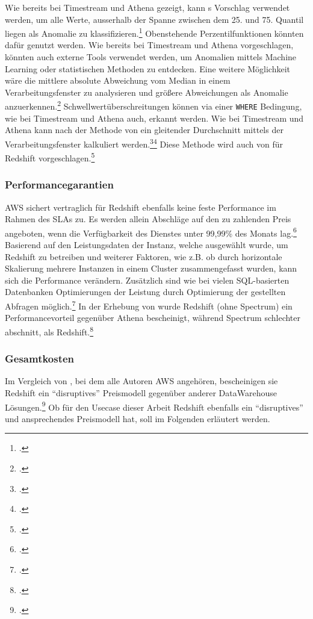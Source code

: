 Wie bereits bei Timestream und Athena gezeigt, kann \citeauthor{Salgado.2019}s Vorschlag verwendet werden, um alle Werte, ausserhalb der Spanne zwischen dem 25. und 75. Quantil liegen als Anomalie zu klassifizieren.\footcite[Vgl.][]{Salgado.2019} Obenstehende Perzentilfunktionen könnten dafür genutzt werden. Wie bereits bei Timestream und Athena vorgeschlagen, könnten auch externe Tools verwendet werden, um Anomalien mittels Machine Learning oder statistischen Methoden zu entdecken. Eine weitere Möglichkeit wäre die mittlere absolute Abweichung vom Median in einem Verarbeitungsfenster zu analysieren und größere Abweichungen als Anomalie anzuerkennen.\footcite[Vgl.][]{Peak.2017}
Schwellwertüberschreitungen können via einer \texttt{WHERE} Bedingung, wie bei Timestream und Athena auch, erkannt werden.
Wie bei Timestream und Athena kann nach der Methode von \citeauthor{Ross.2020} ein gleitender Durchschnitt mittels der Verarbeitungsfenster kalkuliert werden.\footcite[Vgl.][]{Ross.2020}\nzitat\footcite[Vgl.][]{Ubiq.o.J.} Diese Methode wird auch von \citeauthor{Ubiq.o.J.} für Redshift vorgeschlagen.\footcite[Vgl.][]{Ubiq.o.J.}

\subsubsection{Performancegarantien}
\ac{AWS} sichert vertraglich für Redshift ebenfalls keine feste Performance im Rahmen des \acp{SLA} zu. Es werden allein Abschläge auf den zu zahlenden Preis angeboten, wenn die Verfügbarkeit des Dienstes unter 99,99\% des Monats lag.\footcite[Vgl.][]{AmazonWebServicesInc..2019b} Basierend auf den Leistungsdaten der Instanz, welche ausgewählt wurde, um Redshift zu betreiben und weiterer Faktoren, wie z.B. ob durch horizontale Skalierung mehrere Instanzen in einem Cluster zusammengefasst wurden, kann sich die Performance verändern. Zusätzlich sind wie bei vielen \ac{SQL}-basierten Datenbanken Optimierungen der Leistung durch Optimierung der gestellten Abfragen möglich.\footcite[Vgl.][]{AmazonWebServicesInc..o.J.ab} In der Erhebung von \citeauthor{Tan.2019} wurde Redshift (ohne Spectrum) ein Performancevorteil gegenüber Athena bescheinigt, während Spectrum schlechter abschnitt, als Redshift.\footcite[Vgl.][2176]{Tan.2019}


\subsubsection{Gesamtkosten}
Im Vergleich von \citeauthor{Gupta.2015}, bei dem alle Autoren \ac{AWS} angehören, bescheinigen sie Redshift ein \enquote{disruptives} Preismodell gegenüber anderer DataWarehouse Lösungen.\footcite[Vgl.][]{Gupta.2015} Ob für den Usecase dieser Arbeit Redshift ebenfalls ein \enquote{disruptives} und ansprechendes Preismodell hat, soll im Folgenden erläutert werden.

